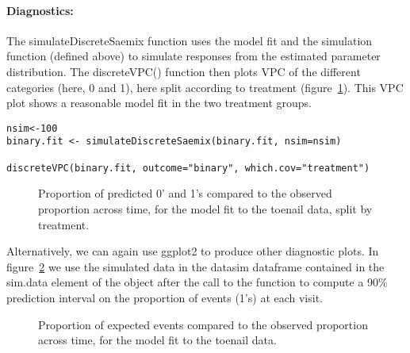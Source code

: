 \paragraph{Diagnostics:} The {\sf simulateDiscreteSaemix} function uses the model fit and the simulation function (defined above) to simulate responses from the estimated parameter distribution. The {\sf discreteVPC()} function then plots VPC of the different categories (here, 0 and 1), here split according to treatment (figure~\ref{fig:toenailTreatVPC}). This VPC plot shows a reasonable model fit in the two treatment groups.
\begin{verbatim}
nsim<-100
binary.fit <- simulateDiscreteSaemix(binary.fit, nsim=nsim)

discreteVPC(binary.fit, outcome="binary", which.cov="treatment")
\end{verbatim}

\begin{figure}[!h]
\begin{center}
\end{center}
\par \kern -0.5cm
\caption{Proportion of predicted 0' and 1's compared to the observed proportion across time, for the model fit to the toenail data, split by treatment.} \label{fig:toenailTreatVPC}
\end{figure}

Alternatively, we can again use {\sf ggplot2} to produce other diagnostic plots. In figure~\ref{fig:toenailPropVPC} we use the simulated data in the {\sf datasim} dataframe contained in the {\sf sim.data} element of the object after the call to the function to compute a 90\% prediction interval on the proportion of events (1's) at each visit. 

\begin{figure}[!h]
\begin{center}
\end{center}
\par \kern -0.5cm
\caption{Proportion of expected events compared to the observed proportion across time, for the model fit to the toenail data.} \label{fig:toenailPropVPC}
\end{figure}


